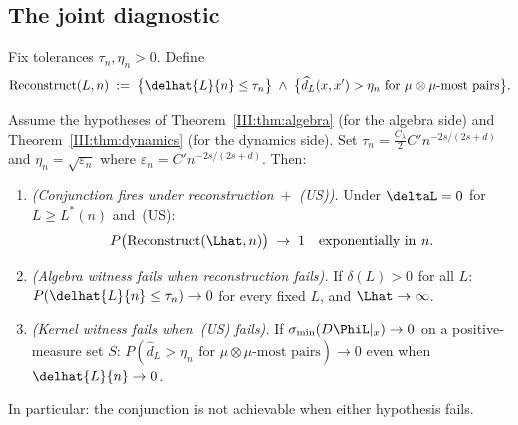\subsection{The joint diagnostic}

\begin{definition}
\label{III:def:diagnostic}
Fix tolerances $\tau_n, \eta_n > 0$.
Define
\[
  \mathrm{Reconstruct}(L, n)
  \;:=\;
  \bigl\{\delhat{L}{n} \leq \tau_n\bigr\}
  \;\wedge\;
  \bigl\{\widehat{d}_L(x,x') > \eta_n
    \text{ for $\mu \otimes \mu$-most pairs}\bigr\}.
\]
\end{definition}

\begin{theorem}
\label{III:thm:conjunction}
Assume the hypotheses of Theorem~\ref{III:thm:algebra} (for the algebra side)
and Theorem~\ref{III:thm:dynamics} (for the dynamics side).
Set $\tau_n = \frac{C_\lambda}{2} C' n^{-2s/(2s+d)}$ and
$\eta_n = \sqrt{\varepsilon_n}$ where $\varepsilon_n = C' n^{-2s/(2s+d)}$.
Then:
\begin{enumerate}[label=(\alph*)]
  \item \emph{(Conjunction fires under reconstruction~$+$~(US)).}
    Under $\deltaL = 0$ for $L \geq L^*(n)$ and~(US):
    \[
      P\bigl(\mathrm{Reconstruct}(\Lhat, n)\bigr) \;\to\; 1
      \quad\text{exponentially in } n.
    \]
  \item \emph{(Algebra witness fails when reconstruction fails).}
    If $\delta(L) > 0$ for all $L$: $P(\delhat{L}{n} \leq \tau_n) \to 0$
    for every fixed $L$, and $\Lhat \to \infty$.

  \item \emph{(Kernel witness fails when~(US) fails).}
    If $\sigma_{\min}(D\PhiL|_x) \to 0$ on a positive-measure set $S$:
    $P(\widehat{d}_L > \eta_n \text{ for }\mu\otimes\mu\text{-most pairs}) \to 0$
    even when $\delhat{L}{n} \to 0$.
\end{enumerate}
In particular: the conjunction is not achievable when either hypothesis fails.
\end{theorem}

